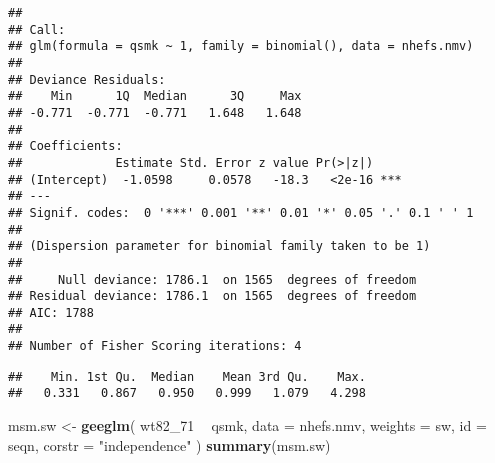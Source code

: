 \documentclass[10pt,]{book}
\newenvironment{Shaded}{\begin{snugshade}}{\end{snugshade}}
\newcommand{\DataTypeTok}[1]{\textcolor[rgb]{0.13,0.29,0.53}{#1}}
\newcommand{\DecValTok}[1]{\textcolor[rgb]{0.00,0.00,0.81}{#1}}
\newcommand{\KeywordTok}[1]{\textcolor[rgb]{0.13,0.29,0.53}{\textbf{#1}}}
\newcommand{\NormalTok}[1]{#1}
\newcommand{\OperatorTok}[1]{\textcolor[rgb]{0.81,0.36,0.00}{\textbf{#1}}}
\newcommand{\StringTok}[1]{\textcolor[rgb]{0.31,0.60,0.02}{#1}}
\begin{document}
\begin{verbatim}
## 
## Call:
## glm(formula = qsmk ~ 1, family = binomial(), data = nhefs.nmv)
## 
## Deviance Residuals: 
##    Min      1Q  Median      3Q     Max  
## -0.771  -0.771  -0.771   1.648   1.648  
## 
## Coefficients:
##             Estimate Std. Error z value Pr(>|z|)    
## (Intercept)  -1.0598     0.0578   -18.3   <2e-16 ***
## ---
## Signif. codes:  0 '***' 0.001 '**' 0.01 '*' 0.05 '.' 0.1 ' ' 1
## 
## (Dispersion parameter for binomial family taken to be 1)
## 
##     Null deviance: 1786.1  on 1565  degrees of freedom
## Residual deviance: 1786.1  on 1565  degrees of freedom
## AIC: 1788
## 
## Number of Fisher Scoring iterations: 4
\end{verbatim}

\begin{Shaded}
\end{Shaded}

\begin{verbatim}
##    Min. 1st Qu.  Median    Mean 3rd Qu.    Max. 
##   0.331   0.867   0.950   0.999   1.079   4.298
\end{verbatim}

\begin{Shaded}
\begin{Highlighting}[]
\NormalTok{msm.sw <-}\StringTok{ }\KeywordTok{geeglm}\NormalTok{(}
\NormalTok{  wt82_}\DecValTok{71} \OperatorTok{~}\StringTok{ }\NormalTok{qsmk,}
  \DataTypeTok{data =}\NormalTok{ nhefs.nmv,}
  \DataTypeTok{weights =}\NormalTok{ sw,}
  \DataTypeTok{id =}\NormalTok{ seqn,}
  \DataTypeTok{corstr =} \StringTok{"independence"}
\NormalTok{)}
\KeywordTok{summary}\NormalTok{(msm.sw)}
\end{Highlighting}
\end{Shaded}
\end{document}
